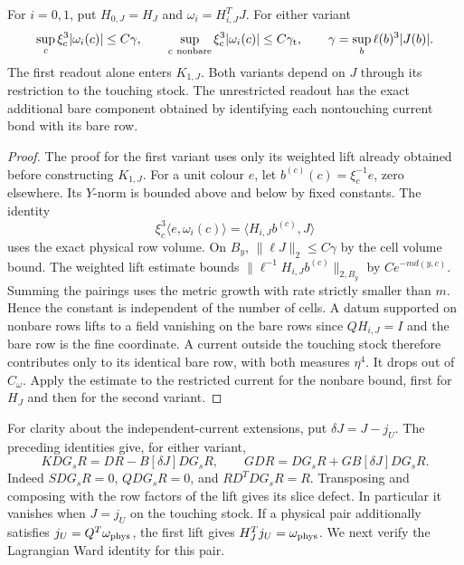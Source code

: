 \documentclass[11pt,letterpaper,reqno]{amsart}
\makeatletter
\numberwithin{equation}{section}
\theoremstyle{definition}
\newcommand{\ms@majorstart}{%
  \pushQED{\qed}\renewcommand{\qedsymbol}{$\blacksquare\square$}}
\newenvironment{corollary}[1][]{\ms@majorstart\ms@corollary[#1]}
  {\popQED\endms@corollary}
\theoremstyle{remark}
\makeatother
\begin{document}
\begin{corollary}[The two physical current readouts]
\label{mb:cor-current-readouts}
For \(i=0,1\), put \(H_{0,J}=H_J\) and \(\omega_i=H_{i,J}^T J\). For either variant
\[
 \sup_c\xi_c^3|\omega_i(c)|\le C\gamma,\qquad
 \sup_{c\ \mathrm{nonbare}}\xi_c^3|\omega_i(c)|\le C\gamma_{\rm t},
 \qquad \gamma=\sup_b\ell(b)^3|J(b)|.
\]
The first readout alone enters \(K_{1,J}\). Both variants depend on \(J\) through its restriction to the touching stock. The unrestricted readout has the exact additional bare component obtained by identifying each nontouching current bond with its bare row.
\end{corollary}

\begin{proof}
The proof for the first variant uses only its weighted lift already obtained before constructing \(K_{1,J}\). For a unit colour \(e\), let \(b^{(c)}(c)=\xi_c^{-1}e\), zero elsewhere. Its \(Y\)-norm is bounded above and below by fixed constants. The identity
\[
 \xi_c^3\langle e,\omega_i(c)\rangle
      =\langle H_{i,J} b^{(c)},J\rangle
\]
uses the exact physical row volume. On \(B_y\), \(\|\ell J\|_2\le C\gamma\) by the cell volume bound. The weighted lift estimate bounds \(\|\ell^{-1} H_{i,J}b^{(c)}\|_{2,B_y}\) by \(Ce^{-m d(y,c)}\). Summing the pairings uses the metric growth with rate strictly smaller than \(m\). Hence the constant is independent of the number of cells. A datum supported on nonbare rows lifts to a field vanishing on the bare rows since \(QH_{i,J}=I\) and the bare row is the fine coordinate. A current outside the touching stock therefore contributes only to its identical bare row, with both measures \(\eta^4\). It drops out of \(C_\omega\). Apply the estimate to the restricted current for the nonbare bound, first for \(H_J\) and then for the second variant.
\end{proof}

For clarity about the independent-current extensions, put \(\delta J=J-j_U\). The preceding identities give, for either variant,
\begin{equation}\label{mb:eq-off-current-defect}
 K DG_sR=DR-B[\delta J]DG_sR,\qquad
 GDR=DG_sR+GB[\delta J]DG_sR .
\end{equation}
Indeed \(S DG_sR=0\), \(QDG_sR=0\), and \(RD^TDG_sR=R\). Transposing and composing with the row factors of the lift gives its slice defect. In particular it vanishes when \(J=j_U\) on the touching stock. If a physical pair additionally satisfies \(j_U=Q^T\omega_{\rm phys}\), the first lift gives \(H_J^Tj_U=\omega_{\rm phys}\). We next verify the Lagrangian Ward identity for this pair.
\end{document}
